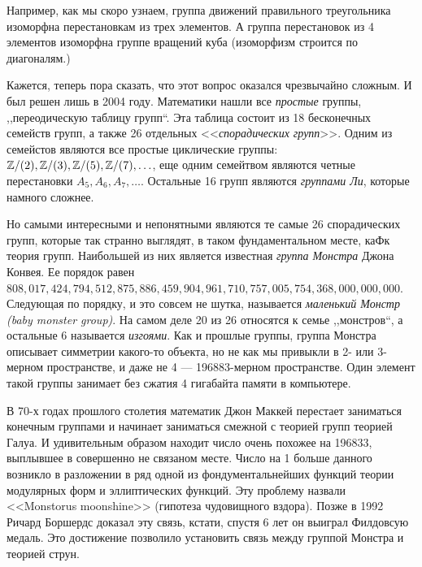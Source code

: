\begin{example}
    Например, как мы скоро узнаем, группа движений правильного треугольника изоморфна перестановкам из трех элементов. А группа перестановок из 4 элементов изоморфна группе вращений куба (изоморфизм строится по диагоналям.)
\end{example}

Кажется, теперь пора сказать, что этот вопрос оказался чрезвычайно сложным. И был решен лишь в 2004 году. Математики нашли все \emph{простые} группы, ,,переодическую таблицу групп``. Эта таблица состоит из 18 бесконечных семейств групп, а также 26 отдельных <<\emph{спорадических групп}>>. Одним из семейстов являются все простые циклические группы: $\mathbb Z/(2), \mathbb Z/(3), \mathbb Z/(5), \mathbb Z/(7), \ldots$, еще одним семейтвом являются четные перестановки $A_5, A_6, A_7, \ldots$. Остальные 16 групп являются \emph{группами Ли}, которые намного сложнее.

Но самыми интересными и непонятными являются те самые 26 спорадических групп, которые так странно выглядят, в таком фундаментальном месте, каФк теория групп. Наибольшей из них является известная \emph{группа Монстра} Джона Конвея. Ее порядок равен \\$808,017,424,794,512,875,886,459,904,961,710,757,005,754,368,000,000,000$. Следующая по порядку, и это совсем не шутка, называется \emph{маленький Монстр (baby monster group)}. На самом деле 20 из 26 относятся к семье ,,монстров``, а остальные 6 называется \emph{изгоями}. Как и прошлые группы, группа Монстра описывает симметрии какого-то объекта, но не как мы привыкли в 2- или 3-мерном пространстве, и даже не 4 --- 196883-мерном пространстве. Один элемент такой группы занимает без сжатия 4 гигабайта памяти в компьютере.

В 70-х годах прошлого столетия математик Джон Маккей перестает заниматься конечным группами и начинает заниматься смежной с теорией групп теорией Галуа. И удивительным образом находит число очень похожее на 196833, выплывшее в совершенно не связаном месте. Число на 1 больше данного возникло в разложении в ряд одной из фондументальнейших функций теории модулярных форм и эллиптических функций. Эту проблему назвали <<Monstorus moonshine>> (гипотеза чудовищного вздора). Позже в 1992 Ричард Боршердс доказал эту связь, кстати, спустя 6 лет он выиграл Филдовсую медаль. Это достижение позволило установить связь между группой Монстра и теорией струн.
